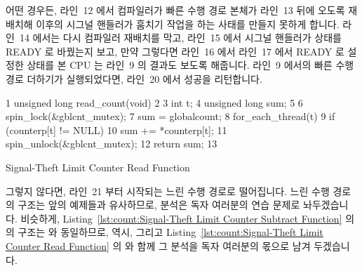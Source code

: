 어떤 경우든, 라인~12 에서 컴파일러가 빠른 수행 경로 본체가 라인~13 뒤에 오도록
재배치해 이후의 시그널 핸들러가 훔치기 작업을 하는 사태를 만들지 못하게 합니다.
라인~14 에서는 다시 컴파일러 재배치를 막고, 라인~15 에서 시그널 핸들러가
 상태를 READY 로 바꿨는지 보고, 만약 그렇다면 라인~16 에서 라인~17
에서 READY 로 설정한 상태를 본 CPU 는 라인~9 의 결과도 보도록 해줍니다.
라인~9 에서의 빠른 수행 경로 더하기가 실행되었다면, 라인~20 에서 성공을
리턴합니다.

\begin{listing}[tbp]
{ \scriptsize
\begin{verbbox}
  1 unsigned long read_count(void)
  2 {
  3   int t;
  4   unsigned long sum;
  5 
  6   spin_lock(&gblcnt_mutex);
  7   sum = globalcount;
  8   for_each_thread(t)
  9     if (counterp[t] != NULL)
 10       sum += *counterp[t];
 11   spin_unlock(&gblcnt_mutex);
 12   return sum;
 13 }
\end{verbbox}
}
\centering
\theverbbox
\caption{Signal-Theft Limit Counter Read Function}
\label{lst:count:Signal-Theft Limit Counter Read Function}
\end{listing}

그렇지 않다면, 라인~21 부터 시작되는 느린 수행 경로로 떨어집니다.
느린 수행 경로의 구조는 앞의 예제들과 유사하므로, 분석은 독자 여러분의 연습
문제로 놔두겠습니다.
비슷하게, Listing~\ref{lst:count:Signal-Theft Limit Counter Subtract Function}
의  의 구조는  와 동일하므로, 
역시, 그리고 Listing~\ref{lst:count:Signal-Theft Limit Counter Read Function}
의  와 함께 그 분석을 독자 여러분의 몫으로 남겨 두겠습니다.

